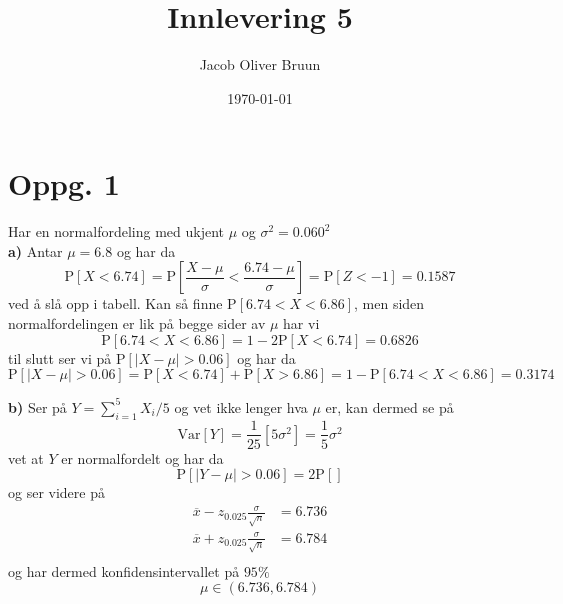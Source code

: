 \documentclass{report}
\title{Innlevering 5}
\author{Jacob Oliver Bruun}
\date{\today}
\newcommand{\nbrack}[1]{\left( #1 \right)}
\newcommand{\bbrack}[1]{\left[ #1 \right]}
\newcommand{\Var}[1]{\text{Var} \bbrack{ #1 }}
\newcommand{\Prob}[1]{\text{P} \bbrack{ #1 }}
\begin{document}
\section*{Oppg. 1}
Har en normalfordeling med ukjent $\mu$ og $\sigma^{2} = 0.060^{2}$ \\

\textbf{a)}
Antar $\mu = 6.8$ og har da
\begin{equation}
  \label{eq:1}
  \Prob{ X < 6.74 } = \Prob{ \frac{X-\mu}{\sigma} < \frac{6.74 - \mu}{\sigma}} = \Prob{ Z < -1 } = 0.1587
\end{equation}
ved å slå opp i tabell. Kan så finne $\Prob{6.74 < X < 6.86}$, men siden normalfordelingen er lik på begge sider av $\mu$ har vi
\begin{equation}
  \label{eq:2}
  \Prob{6.74 < X < 6.86} = 1 - 2\Prob{ X < 6.74 } = 0.6826
\end{equation}
til slutt ser vi på $\Prob{ |X - \mu| > 0.06 }$ og har da
\begin{equation}
  \label{eq:3}
  \Prob{ |X - \mu| > 0.06 } = \Prob{X < 6.74} + \Prob{X > 6.86} = 1 - \Prob{6.74 < X < 6.86} = 0.3174
\end{equation}

\textbf{b)}
Ser på $Y = \sum_{i=1}^{5} X_{i}/5$ og vet ikke lenger hva $\mu$ er, kan dermed se på
\begin{equation}
  \label{eq:5}
  \Var{Y} = \frac{1}{25} \bbrack{ 5\sigma^{2} } = \frac{1}{5} \sigma^{2}
\end{equation}
vet at $Y$ er normalfordelt og har da
\begin{equation}
  \label{eq:20}
  \Prob{|Y-\mu| > 0.06} = 2\Prob{}
\end{equation}
og ser videre på
\begin{equation}
  \label{eq:18}
  \begin{split}
    \overline{x} - z_{0.025}\frac{\sigma}{\sqrt{n}} &= 6.736 \\
    \overline{x} + z_{0.025}\frac{\sigma}{\sqrt{n}} &= 6.784 \\
  \end{split}
\end{equation}
og har dermed konfidensintervallet på $95\%$
\begin{equation}
  \label{eq:19}
  \mu \in \nbrack{ 6.736, 6.784 }
\end{equation}
\end{document}
